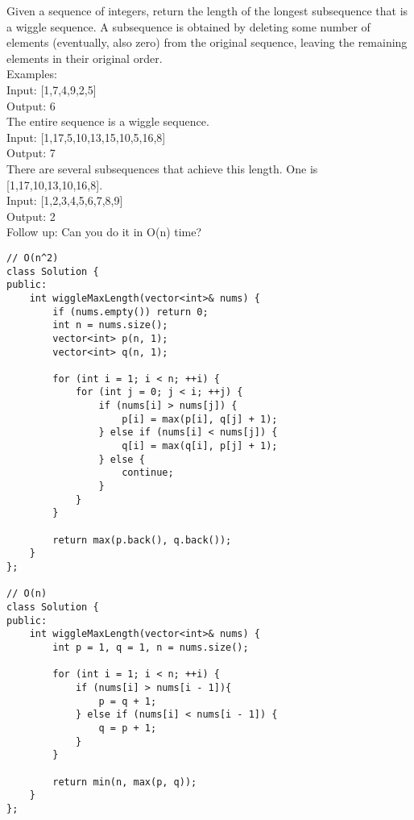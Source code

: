 Given a sequence of integers, return the length of the longest subsequence that is a wiggle sequence. A subsequence is obtained by deleting some number of elements (eventually, also zero) from the original sequence, leaving the remaining elements in their original order.\\

Examples:\\

Input: [1,7,4,9,2,5]\\
Output: 6\\
The entire sequence is a wiggle sequence.\\

Input: [1,17,5,10,13,15,10,5,16,8]\\
Output: 7\\
There are several subsequences that achieve this length. One is [1,17,10,13,10,16,8].\\

Input: [1,2,3,4,5,6,7,8,9]\\
Output: 2\\

Follow up: Can you do it in O(n) time? \\

\begin{lstlisting}
// O(n^2)
class Solution {
public:
    int wiggleMaxLength(vector<int>& nums) {
        if (nums.empty()) return 0;
        int n = nums.size();
        vector<int> p(n, 1);
        vector<int> q(n, 1);
        
        for (int i = 1; i < n; ++i) {
            for (int j = 0; j < i; ++j) {
                if (nums[i] > nums[j]) {
                    p[i] = max(p[i], q[j] + 1);
                } else if (nums[i] < nums[j]) {
                    q[i] = max(q[i], p[j] + 1);
                } else {
                    continue;
                }
            }
        }
        
        return max(p.back(), q.back());
    }
};

// O(n)
class Solution {
public:
    int wiggleMaxLength(vector<int>& nums) {
        int p = 1, q = 1, n = nums.size();
        
        for (int i = 1; i < n; ++i) {
            if (nums[i] > nums[i - 1]){ 
                p = q + 1;
            } else if (nums[i] < nums[i - 1]) {
                q = p + 1;
            }
        }
        
        return min(n, max(p, q));
    }
};
\end{lstlisting}



